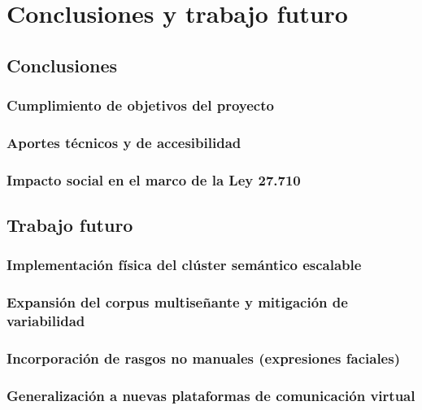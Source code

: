 
\chapter{Conclusiones y trabajo futuro}

\section{Conclusiones}
\subsection{Cumplimiento de objetivos del proyecto}
\subsection{Aportes técnicos y de accesibilidad}
\subsection{Impacto social en el marco de la Ley 27.710}

\section{Trabajo futuro}
\subsection{Implementación física del clúster semántico escalable}
\subsection{Expansión del corpus multiseñante y mitigación de variabilidad}
\subsection{Incorporación de rasgos no manuales (expresiones faciales)}
\subsection{Generalización a nuevas plataformas de comunicación virtual}
